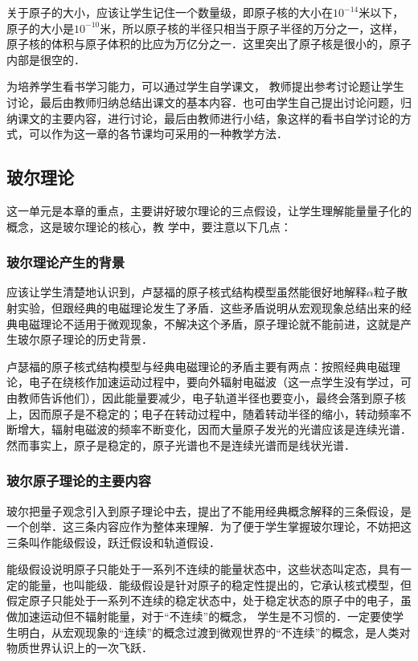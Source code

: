 关于原子的大小，应该让学生记住一个数量级，即原子核的大小在$10^{-14}$米以下，原子的大小是$10^{-10}$米，所以原子核的半径只相当于原子半径的万分之一，这样，原子核的体积与原子体积的比应为万亿分之一．这里突出了原子核是很小的，原子内部是很空的．

为培养学生看书学习能力，可以通过学生自学课文，
教师提出参考讨论题让学生讨论，最后由教师归纳总结出课文的基本内容．也可由学生自己提出讨论问题，归纳课文的主要内容，进行讨论，最后由教师进行小结，象这样的看书自学讨论的方式，可以作为这一章的各节课均可采用的一种教学方法．

\subsection{玻尔理论}
这一单元是本章的重点，主要讲好玻尔理论的三点假设，让学生理解能量量子化的概念，这是玻尔理论的核心，教
学中，要注意以下几点：

\subsubsection{玻尔理论产生的背景}

应该让学生清楚地认识到，卢瑟福的原子核式结构模型虽然能很好地解释$\alpha$粒子散射实验，但跟经典的电磁理论发生了矛盾．这些矛盾说明从宏观现象总结出来的经典电磁理论不适用于微观现象，不解决这个矛盾，原子理论就不能前进，这就是产生玻尔原子理论的历史背景．

卢瑟福的原子核式结构模型与经典电磁理论的矛盾主要有两点：按照经典电磁理论，电子在绕核作加速运动过程中，要向外辐射电磁波（这一点学生没有学过，可由教师告诉他们），因此能量要减少，电子轨道半径也要变小，最终会落到原子核上，因而原子是不稳定的；电子在转动过程中，随着转动半径的缩小，转动频率不断增大，辐射电磁波的频率不断变化，因而大量原子发光的光谱应该是连续光谱．然而事实上，原子是稳定的，原子光谱也不是连续光谱而是线状光谱．

\subsubsection{玻尔原子理论的主要内容}
玻尔把量子观念引入到原子理论中去，提出了不能用经典概念解释的三条假设，是一个创举．这三条内容应作为整体来理解．为了便于学生掌握玻尔理论，不妨把这三条叫作能级假设，跃迁假设和轨道假设．

能级假设说明原子只能处于一系列不连续的能量状态中，这些状态叫定态，具有一定的能量，也叫能级．能级假设是针对原子的稳定性提出的，它承认核式模型，但假定原子只能处于一系列不连续的稳定状态中，处于稳定状态的原子中的电子，虽做加速运动但不辐射能量，对于“不连续”的概念，
学生是不习惯的．一定要使学生明白，从宏观现象的“连续”的概念过渡到微观世界的“不连续”的概念，是人类对物质世界认识上的一次飞跃．

